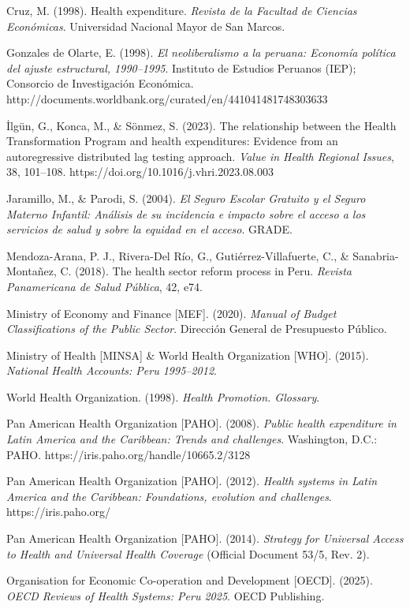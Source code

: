 \documentclass[12pt]{article}
\begin{document}
Cruz, M. (1998). Health expenditure. \textit{Revista de la Facultad de Ciencias Económicas}. Universidad Nacional Mayor de San Marcos.

Gonzales de Olarte, E. (1998). \textit{El neoliberalismo a la peruana: Economía política del ajuste estructural, 1990–1995}. Instituto de Estudios Peruanos (IEP); Consorcio de Investigación Económica. http://documents.worldbank.org/curated/en/441041481748303633

İlgün, G., Konca, M., \& Sönmez, S. (2023). The relationship between the Health Transformation Program and health expenditures: Evidence from an autoregressive distributed lag testing approach. \textit{Value in Health Regional Issues}, 38, 101–108. https://doi.org/10.1016/j.vhri.2023.08.003

Jaramillo, M., \& Parodi, S. (2004). \textit{El Seguro Escolar Gratuito y el Seguro Materno Infantil: Análisis de su incidencia e impacto sobre el acceso a los servicios de salud y sobre la equidad en el acceso}. GRADE.

Mendoza-Arana, P. J., Rivera-Del Río, G., Gutiérrez-Villafuerte, C., \& Sanabria-Montañez, C. (2018). The health sector reform process in Peru. \textit{Revista Panamericana de Salud Pública}, 42, e74.

Ministry of Economy and Finance [MEF]. (2020). \textit{Manual of Budget Classifications of the Public Sector}. Dirección General de Presupuesto Público.

Ministry of Health [MINSA] \& World Health Organization [WHO]. (2015). \textit{National Health Accounts: Peru 1995–2012}.

World Health Organization. (1998). \textit{Health Promotion. Glossary}.

Pan American Health Organization [PAHO]. (2008). \textit{Public health expenditure in Latin America and the Caribbean: Trends and challenges}. Washington, D.C.: PAHO. https://iris.paho.org/handle/10665.2/3128

Pan American Health Organization [PAHO]. (2012). \textit{Health systems in Latin America and the Caribbean: Foundations, evolution and challenges}. https://iris.paho.org/

Pan American Health Organization [PAHO]. (2014). \textit{Strategy for Universal Access to Health and Universal Health Coverage} (Official Document 53/5, Rev. 2).

Organisation for Economic Co-operation and Development [OECD]. (2025). \textit{OECD Reviews of Health Systems: Peru 2025}. OECD Publishing.
\end{document}
